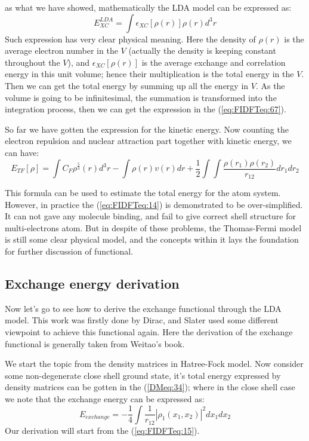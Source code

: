 as what we have showed, mathematically the LDA model can be expressed
as\cite{HK1}:
\begin{equation}
  \label{eq:FIDFTeq:67}
E^{LDA}_{XC} = \int \epsilon_{XC}[\rho(r)]\rho(r)d^{3}r
\end{equation}
Such expression has very clear physical meaning. Here the density of
$\rho(r)$ is the average electron number in the $V$ (actually the
density is keeping constant throughout the $V$), and
$\epsilon_{XC}[\rho(r)]$ is the average exchange and correlation
energy in this unit volume; hence their multiplication is the total
energy in the $V$. Then we can get the total energy by summing up
all the energy in $V$. As the volume is going to be infinitesimal,
the summation is transformed into the integration process, then we
can get the expression in the (\ref{eq:FIDFTeq:67}).

So far we have gotten the expression for the kinetic energy. Now
counting the electron repulsion and nuclear attraction part together
with kinetic energy, we can have:
\begin{equation}
\label{eq:FIDFTeq:14} E_{TF}[\rho] = \int
C_{F}\rho^{\frac{5}{3}}(r)d^{3}r - \int \rho(r)v(r)dr +
\frac{1}{2}\int\int
\frac{\rho(r_{1})\rho(r_{2})}{r_{12}}dr_{1}dr_{2}
\end{equation}

This formula can be used to estimate the total energy for the atom
system. However, in practice the (\ref{eq:FIDFTeq:14}) is demonstrated
to be over-simplified. It can not gave any molecule binding, and fail
to give correct shell structure for multi-electrons
atom\cite{weitaoYang}. But in despite of these problems, the Thomas-Fermi
model is still some clear physical model, and the concepts within it
lays the foundation for further discussion of functional.

\subsection{Exchange energy derivation}
%
%
%
%
Now let's go to see how to derive the exchange functional through
the LDA model. This work was firstly done by
Dirac\cite{CambridgeJournals:2040328}, and
Slater\cite{PhysRev.81.385} used some different viewpoint to achieve
this functional again. Here the derivation of the exchange
functional is generally taken from Weitao's book\cite{weitaoYang}.

We start the topic from the density matrices in Hatree-Fock model. Now
consider some non-degenerate close shell ground state, it's total
energy expressed by density matrices can be gotten in the
(\ref{DMeq:34}); where in the close shell case we note that the
exchange energy can be expressed as:
\begin{equation}
\label{eq:FIDFTeq:15}
    E_{exchange} =  -\frac{1}{4}\int \frac{1}{r_{12}}
  |\rho_{1}(x_{1},x_{2})|^{2}dx_{1}dx_{2}
\end{equation}
Our derivation will start from the (\ref{eq:FIDFTeq:15}).


